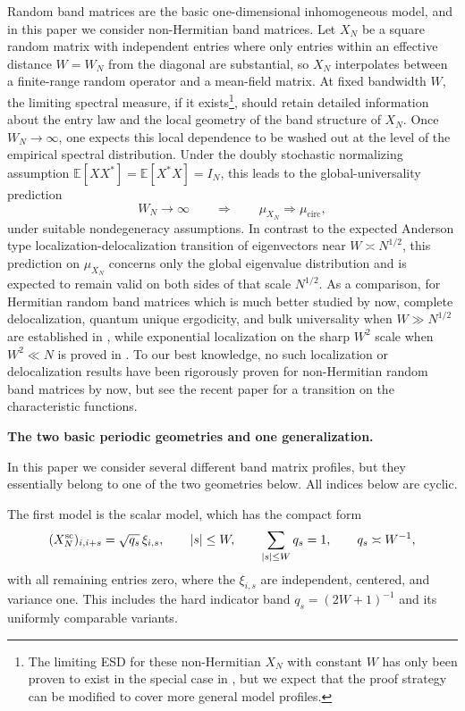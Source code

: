 \documentclass[11pt,reqno]{amsart}
\numberwithin{equation}{section}
\theoremstyle{definition}
\theoremstyle{remark}
\newcommand{\1}{\mathbf 1}
\newcommand{\cir}{\mathrm{circ}}
\newcommand{\introheading}[1]{%
  \par\medskip\noindent\textbf{#1.}\par\smallskip}
\begin{document}
Random band matrices are the basic one-dimensional inhomogeneous model, and in this paper we consider non-Hermitian band matrices. Let $X_N$ be a square random matrix with independent entries where only entries within an effective distance \(W=W_N\) from the diagonal are
substantial, so \(X_N\) interpolates between a finite-range random operator
and a mean-field matrix.  At fixed bandwidth $W$, the limiting spectral measure, if it exists\footnote{The limiting ESD for these non-Hermitian $X_N$ with constant $W$ has only been proven to exist in the special case in \cite{GoldsheidKhoruzhenko2005}, but we expect that the proof strategy can be modified to cover more general model profiles.},
should retain detailed information about the entry law and the local
geometry of the band structure of $X_N$.  Once \(W_N\to\infty\), one expects this local dependence to be
washed out at the level of the empirical spectral distribution.  Under the doubly stochastic normalizing assumption $\mathbb{E}[XX^*]=\mathbb{E}[X^*X]=I_N$, this
leads to the global-universality prediction
\[
 W_N\longrightarrow\infty
 \qquad\Longrightarrow\qquad
 \mu_{X_N}\Longrightarrow\mu_{\cir},
\]
under suitable nondegeneracy assumptions. In contrast to the
expected Anderson type localization-delocalization transition of eigenvectors near \(W\asymp N^{1/2}\), this prediction on $\mu_{X_N}$ concerns
only the global eigenvalue distribution and is expected to remain valid
on both sides of that scale $N^{1/2}$. As a comparison, for Hermitian random band matrices which is much better studied by now, complete
delocalization, quantum unique ergodicity, and bulk universality when $W\gg N^{1/2}$ are established in \cite{YauYin2025,ErdosRiabov2025}, while
exponential localization on the sharp \(W^2\) scale when \(W^2\ll N\) is
proved in \cite{Drogin2025}. To our best knowledge, no such localization or delocalization results have been rigorously proven for non-Hermitian random band matrices by now, but see the recent paper \cite{ShcherbinaShcherbina2025} for a transition on the characteristic functions.

\introheading{The two basic periodic geometries and one generalization}In this paper we consider several different band matrix profiles, but they essentially belong to one of the two geometries below. All indices below are cyclic.  

The first model is the scalar model, which has the compact form
\begin{equation}\label{eq:intro-scalar-model}
 (X_N^{\rm sc})_{i,i+s}=\sqrt{q_s}\,\xi_{i,s},\qquad
 |s|\le W,\qquad
 \sum_{|s|\le W}q_s=1,\qquad q_s\asymp W^{-1},
\end{equation}
with all remaining entries zero, where the \(\xi_{i,s}\) are independent,
centered, and variance one.  This includes the hard indicator band
\(q_s=(2W+1)^{-1}\) and its uniformly comparable variants.
\end{document}
